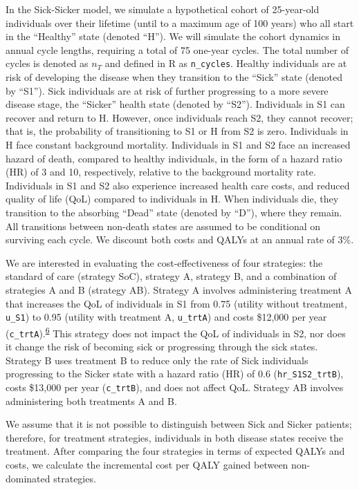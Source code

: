 \documentclass[
]{article}
\begin{document}
In the Sick-Sicker model, we simulate a hypothetical cohort of 25-year-old individuals over their lifetime (until to a maximum age of 100 years) who all start in the ``Healthy'' state (denoted ``H''). We will simulate the cohort dynamics in annual cycle lengths, requiring a total of 75 one-year cycles. The total number of cycles is denoted as \(n_T\) and defined in R as \texttt{n\_cycles}. Healthy individuals are at risk of developing the disease when they transition to the ``Sick'' state (denoted by ``S1''). Sick individuals are at risk of further progressing to a more severe disease stage, the ``Sicker'' health state (denoted by ``S2''). Individuals in S1 can recover and return to H. However, once individuals reach S2, they cannot recover; that is, the probability of transitioning to S1 or H from S2 is zero. Individuals in H face constant background mortality. Individuals in S1 and S2 face an increased hazard of death, compared to healthy individuals, in the form of a hazard ratio (HR) of 3 and 10, respectively, relative to the background mortality rate. Individuals in S1 and S2 also experience increased health care costs, and reduced quality of life (QoL) compared to individuals in H. When individuals die, they transition to the absorbing ``Dead'' state (denoted by ``D''), where they remain. All transitions between non-death states are assumed to be conditional on surviving each cycle. We discount both costs and QALYs at an annual rate of 3\%.

We are interested in evaluating the cost-effectiveness of four strategies: the standard of care (strategy SoC), strategy A, strategy B, and a combination of strategies A and B (strategy AB). Strategy A involves administering treatment A that increases the QoL of individuals in S1 from 0.75 (utility without treatment, \texttt{u\_S1}) to 0.95 (utility with treatment A, \texttt{u\_trtA}) and costs \$12,000 per year (\texttt{c\_trtA}).\textsuperscript{\protect\hyperlink{ref-Krijkamp2018}{6}} This strategy does not impact the QoL of individuals in S2, nor does it change the risk of becoming sick or progressing through the sick states. Strategy B uses treatment B to reduce only the rate of Sick individuals progressing to the Sicker state with a hazard ratio (HR) of 0.6 (\texttt{hr\_S1S2\_trtB}), costs \$13,000 per year (\texttt{c\_trtB}), and does not affect QoL. Strategy AB involves administering both treatments A and B.

We assume that it is not possible to distinguish between Sick and Sicker patients; therefore, for treatment strategies, individuals in both disease states receive the treatment. After comparing the four strategies in terms of expected QALYs and costs, we calculate the incremental cost per QALY gained between non-dominated strategies.
\end{document}
